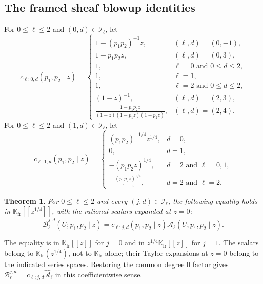 \documentclass{amsart}
\newtheorem{theorem}{Theorem}
\theoremstyle{definition}
\numberwithin{equation}{section}
\newcommand{\K}{\mathbb K}
\begin{document}
\subsection{The framed sheaf blowup identities}
For \(0\leq\ell\leq2\) and \((0,d)\in\mathcal I_\ell\), let
\begin{equation}
 c_{\ell;0,d}(p_1,p_2\mid z)=
 \begin{cases}
 1-(p_1p_2)^{-1}z,&(\ell,d)=(0,-1),\\[2pt]
 1-p_1p_2z,&(\ell,d)=(0,3),\\[2pt]
 1,&\ell=0\text{ and }0\leq d\leq2,\\[2pt]
 1,&\ell=1,\\[2pt]
 1,&\ell=2\text{ and }0\leq d\leq2,\\[2pt]
 (1-z)^{-1},&(\ell,d)=(2,3),\\[2pt]
 \displaystyle\frac{1-p_1p_2z}
 {(1-z)(1-p_1z)(1-p_2z)},&(\ell,d)=(2,4).
 \end{cases}
\label{eq:intro-Hirzebruch-even-scalars}
\end{equation}
For \(0\leq\ell\leq2\) and \((1,d)\in\mathcal I_\ell\), let
\begin{equation}
 c_{\ell;1,d}(p_1,p_2\mid z)=
 \begin{cases}
 (p_1p_2)^{-1/4}z^{1/4},&d=0,\\
 0,&d=1,\\
 -(p_1p_2z)^{1/4},&d=2\text{ and }\ell=0,1,\\[2pt]
 \displaystyle-\frac{(p_1p_2z)^{1/4}}{1-z},
 &d=2\text{ and }\ell=2.
 \end{cases}
\label{eq:intro-Hirzebruch-odd-scalars}
\end{equation}

\begin{theorem}
\label{thm:finite-NY-levels}
For \(0\leq\ell\leq2\) and every \((j,d)\in\mathcal I_\ell\), the following equality holds in \(\K_{\mathrm{fr}}[[z^{1/4}]]\), with the rational scalars expanded at \(z=0\):
\begin{equation}
 \overline{\mathscr B}_{\ell}^{j,d}(U;p_1,p_2\mid z)
 =c_{\ell;j,d}(p_1,p_2\mid z)
  \mathcal A_\ell(U;p_1,p_2\mid z).
\label{eq:determinant-power-common-relation}
\end{equation}
\end{theorem}

The equality is in \(\K_{\mathrm{fr}}[[z]]\) for \(j=0\) and in \(z^{1/4}\K_{\mathrm{fr}}[[z]]\) for \(j=1\).  The scalars belong to \(\K_{\mathrm{fr}}(z^{1/4})\), not to \(\K_{\mathrm{fr}}\) alone; their Taylor expansions at \(z=0\) belong to the indicated series spaces.  Restoring the common degree \(0\) factor gives \(\mathscr B_{\ell}^{j,d}=c_{\ell;j,d}\widehat{\mathcal A}_\ell\) in this coefficientwise sense.
\end{document}

